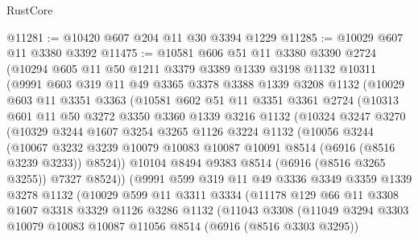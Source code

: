 \begin{lexlean}{RustCore}
\begin{coremodule}
@11281 := @10420 @607 @204 @11 @30 @3394 @1229
@11285 := @10029 @607 @11 @3380 @3392
@11475 := @10581
    @606
    @51
    @11
    @3380
    @3390
    @2724
    (@10294
      @605
      @11
      @50
      @1211
      @3379
      @3389
      @1339
      @3198
      @1132
      @10311
      (@9991
        @603
        @319
        @11
        @49
        @3365
        @3378
        @3388
        @1339
        @3208
        @1132
        (@10029
          @603
          @11
          @3351
          @3363
          (@10581
            @602
            @51
            @11
            @3351
            @3361
            @2724
            (@10313
              @601
              @11
              @50
              @3272
              @3350
              @3360
              @1339
              @3216
              @1132
              (@10324
                @3247
                @3270
                (@10329
                  @3244
                  @1607
                  @3254
                  @3265
                  @1126
                  @3224
                  @1132
                  (@10056
                    @3244
                    (@10067
                      @3232
                      @3239
                      @10079
                      @10083
                      @10087
                      @10091
                      @8514
                      (@6916 (@8516 @3239 @3233))
                      @8524))
                  @10104
                  @8494
                  @9383
                  @8514
                  (@6916 (@8516 @3265 @3255))
                  @7327
                  @8524))
              (@9991
                @599
                @319
                @11
                @49
                @3336
                @3349
                @3359
                @1339
                @3278
                @1132
                (@10029
                  @599
                  @11
                  @3311
                  @3334
                  (@11178
                    @129
                    @66
                    @11
                    @3308
                    @1607
                    @3318
                    @3329
                    @1126
                    @3286
                    @1132
                    (@11043
                      @3308
                      (@11049
                        @3294
                        @3303
                        @10079
                        @10083
                        @10087
                        @11056
                        @8514
                        (@6916 (@8516 @3303 @3295))

\end{coremodule}
\end{lexlean}
